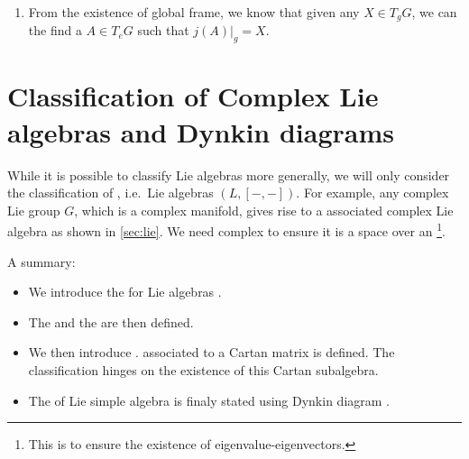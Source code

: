 \documentclass{article}
\begin{document}
\begin{enumerate}
\item From the existence of global frame, we know that given any $X\in T_gG$, we can the find a $A \in T_eG$ such that $j(A)|_g=X$.
\end{enumerate}

\section{Classification of Complex Lie algebras and Dynkin diagrams}\label{sec:Classification}

While it is possible to classify Lie algebras more generally, we will only consider the classification of , i.e.\ Lie algebras $(L,[-,-])$. {\tiny For example, any complex Lie group $G$, which is a complex manifold, gives rise to a associated complex Lie algebra as shown in \cref{sec:lie}.} We need complex to ensure it is a space over an \footnote{This is to ensure the existence of eigenvalue-eigenvectors.}. 

A summary:
\begin{itemize}[$\blacktriangleright$]
\item We introduce the  for Lie algebras .
\item The  and the  are then defined.
\item We then introduce .  associated to a Cartan matrix is defined.  The classification hinges on the existence of this Cartan subalgebra.
\item The  of Lie simple algebra is finaly stated using Dynkin diagram .
\end{itemize}
\end{document}
